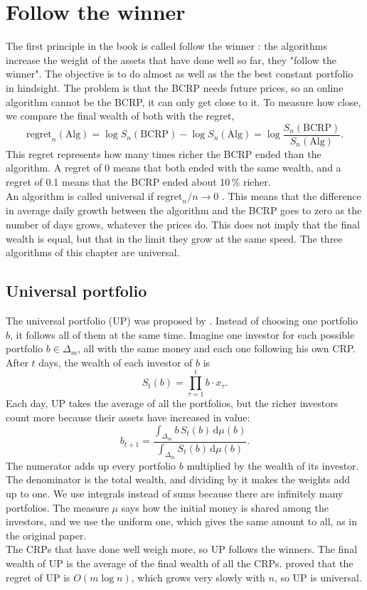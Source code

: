 \chapter{Follow the winner}

The first principle in the book is called follow the winner \parencite[Ch.~4]{lihoi}: the
algorithms increase the weight of the assets that have done well so far, they "follow the winner". 
The objective is to do almost as well as the the best constant portfolio in hindsight. 
The problem is that the BCRP needs future prices, so an online algorithm cannot be the
BCRP, it can only get close to it. To measure how close, we compare the final wealth of
both with the regret,
\[
\mathrm{regret}_n(\mathrm{Alg})=\log S_n(\mathrm{BCRP})-\log S_n(\mathrm{Alg})
=\log\frac{S_n(\mathrm{BCRP})}{S_n(\mathrm{Alg})}.
\]
This regret represents how many times richer the BCRP ended than the algorithm.
A regret of 0 means that both ended with the same wealth, and a regret of
0.1 means that the BCRP ended about 10\,\% richer. \\
An algorithm is called universal if $\mathrm{regret}_n/n\to 0$ \parencite{cover91}. 
This means that the difference in average daily growth between the algorithm and the
BCRP goes to zero as the number of days grows, whatever the prices do. 
This does not imply that the final wealth is equal, but that in the limit they grow at the same speed. 
The three algorithms of this chapter are universal.

\section{Universal portfolio}
The universal portfolio (UP) was proposed by \textcite{cover91}. Instead of choosing one
portfolio $b$, it follows all of them at the same time. Imagine one investor for each
possible portfolio $b\in\Delta_m$, all with the same money and each one following his own
CRP. After $t$ days, the wealth of each investor of $b$ is
\[
S_t(b)=\prod_{\tau=1}^{t}b\cdot x_\tau .
\]
Each day, UP takes the average of all the portfolios, but the richer investors count
more because their assets have increased in value:
\begin{equation}
b_{t+1}=\frac{\int_{\Delta_m}b\,S_t(b)\,\mathrm{d}\mu(b)}{\int_{\Delta_m}S_t(b)\,\mathrm{d}\mu(b)} .
\label{eq:up}
\end{equation}
The numerator adds up every portfolio $b$ multiplied by the wealth of its investor. The
denominator is the total wealth, and dividing by it makes the weights add up to one. We
use integrals instead of sums because there are infinitely many portfolios. The measure
$\mu$ says how the initial money is shared among the investors, and we use the uniform
one, which gives the same amount to all, as in the original paper. 
\\ The CRPs that have done well weigh more, so UP follows the winners. The final wealth
of UP is the average of the final wealth of all the CRPs. \textcite{cover91} proved that
the regret of UP is $O(m\log n)$, which grows very slowly with $n$, so UP is universal. \\

